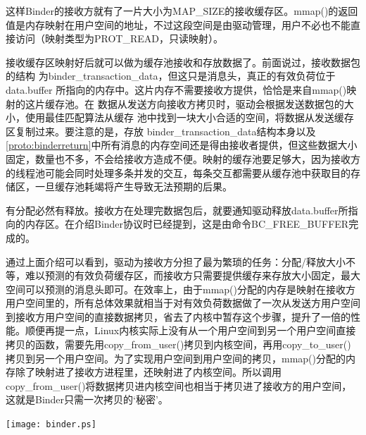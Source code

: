 \documentclass[a4paper,11pt]{article}
\begin{document}
这样Binder的接收方就有了一片大小为MAP_SIZE的接收缓存区。mmap()的返回值是内存映射在用户空间的地址，不过这段空间是由驱动管理，用户不必也不能直接访问（映射类型为PROT_READ，只读映射）。

接收缓存区映射好后就可以做为缓存池接收和存放数据了。前面说过，接收数据包的结构
为binder_transaction_data，但这只是消息头，真正的有效负荷位于
data.buffer
所指向的内存中。这片内存不需要接收方提供，恰恰是来自mmap()映射的这片缓存池。在
数据从发送方向接收方拷贝时，驱动会根据发送数据包的大小，使用最佳匹配算法从缓存
池中找到一块大小合适的空间，将数据从发送缓存区复制过来。要注意的是，存放
binder_transaction_data结构本身以及
\ref{proto:binderreturn}中所有消息的内存空间还是得由接收者提供，但这些数据大小固定，数量也不多，不会给接收方造成不便。映射的缓存池要足够大，因为接收方的线程池可能会同时处理多条并发的交互，每条交互都需要从缓存池中获取目的存储区，一旦缓存池耗竭将产生导致无法预期的后果。

有分配必然有释放。接收方在处理完数据包后，就要通知驱动释放data.buffer所指向的内存区。在介绍Binder协议时已经提到，这是由命令BC_FREE_BUFFER完成的。

通过上面介绍可以看到，驱动为接收方分担了最为繁琐的任务：分配/释放大小不等，难以预测的有效负荷缓存区，而接收方只需要提供缓存来存放大小固定，最大空间可以预测的消息头即可。在效率上，由于mmap()分配的内存是映射在接收方用户空间里的，所有总体效果就相当于对有效负荷数据做了一次从发送方用户空间到接收方用户空间的直接数据拷贝，省去了内核中暂存这个步骤，提升了一倍的性能。顺便再提一点，Linux内核实际上没有从一个用户空间到另一个用户空间直接拷贝的函数，需要先用copy_from_user()拷贝到内核空间，再用copy_to_user()拷贝到另一个用户空间。为了实现用户空间到用户空间的拷贝，mmap()分配的内存除了映射进了接收方进程里，还映射进了内核空间。所以调用copy_from_user()将数据拷贝进内核空间也相当于拷贝进了接收方的用户空间，这就是Binder只需一次拷贝的‘秘密’。

\texttt{[image: binder.ps]}

\end{document}
